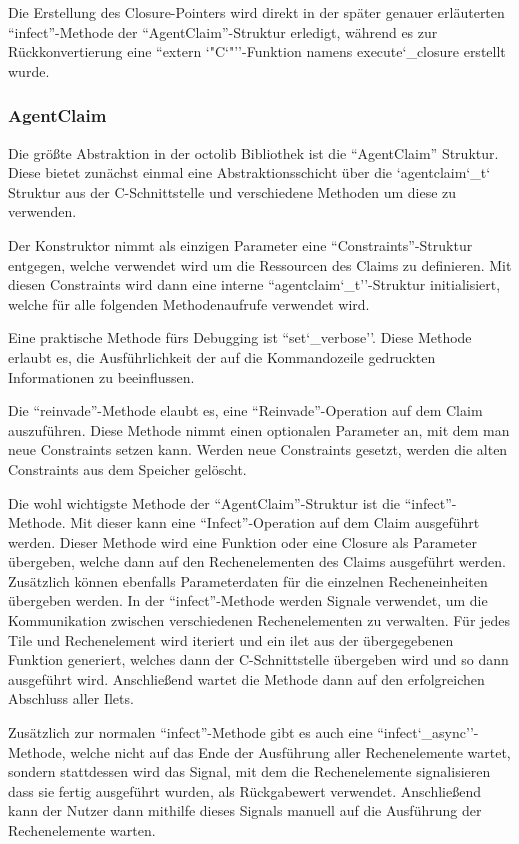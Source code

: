 Die Erstellung des Closure-Pointers wird direkt in der später genauer erläuterten ``infect''-Methode der ``AgentClaim''-Struktur
erledigt, während es zur Rückkonvertierung eine ``extern \char`"C\char`"''-Funktion namens execute\char`_closure erstellt wurde.

\subsubsection{AgentClaim}

Die größte Abstraktion in der octolib Bibliothek ist die ``AgentClaim'' Struktur. Diese bietet zunächst einmal eine Abstraktionsschicht
über die `agentclaim\char`_t` Struktur aus der C-Schnittstelle und verschiedene Methoden um diese zu verwenden.

Der Konstruktor nimmt als einzigen Parameter eine ``Constraints''-Struktur entgegen, welche verwendet wird um die
Ressourcen des Claims zu definieren. Mit diesen Constraints wird dann eine interne ``agentclaim\char`_t''-Struktur initialisiert,
welche für alle folgenden Methodenaufrufe verwendet wird.

Eine praktische Methode fürs Debugging ist ``set\char`_verbose''. Diese Methode erlaubt es, die Ausführlichkeit der auf
die Kommandozeile gedruckten Informationen zu beeinflussen.

Die ``reinvade''-Methode elaubt es, eine ``Reinvade''-Operation auf dem Claim auszuführen. Diese Methode nimmt einen
optionalen Parameter an, mit dem man neue Constraints setzen kann. Werden neue Constraints gesetzt, werden die alten Constraints
aus dem Speicher gelöscht. 

Die wohl wichtigste Methode der ``AgentClaim''-Struktur ist die ``infect''-Methode. Mit dieser kann eine ``Infect''-Operation
auf dem Claim ausgeführt werden. Dieser Methode wird eine Funktion oder eine Closure als Parameter übergeben, welche dann auf den
Rechenelementen des Claims ausgeführt werden. Zusätzlich können ebenfalls Parameterdaten für die einzelnen Recheneinheiten
übergeben werden.
In der ``infect''-Methode werden Signale verwendet, um die Kommunikation zwischen verschiedenen Rechenelementen zu verwalten.
Für jedes Tile und Rechenelement wird iteriert und ein ilet aus der übergegebenen Funktion generiert, welches dann der C-Schnittstelle 
übergeben wird und so dann ausgeführt wird. Anschließend wartet die Methode dann auf den erfolgreichen Abschluss aller Ilets.

Zusätzlich zur normalen ``infect''-Methode gibt es auch eine ``infect\char`_async''-Methode, welche nicht auf das Ende der
Ausführung aller Rechenelemente wartet, sondern stattdessen wird das Signal, mit dem die Rechenelemente signalisieren dass sie fertig
ausgeführt wurden, als Rückgabewert verwendet. Anschließend kann der Nutzer dann mithilfe dieses Signals manuell auf die
Ausführung der Rechenelemente warten.

